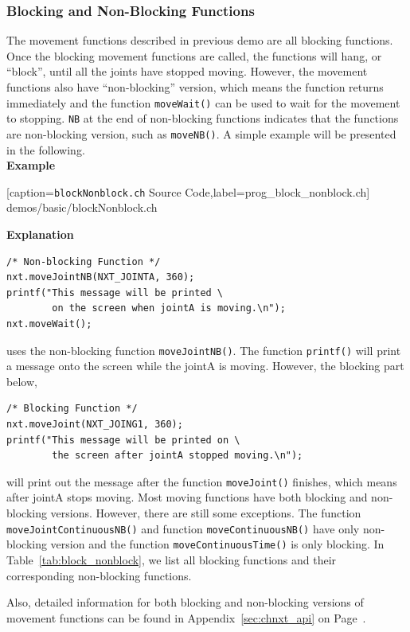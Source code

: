 \documentclass[11pt]{article}
\begin{document}
\subsubsection{\label{sec:block_nonblock}Blocking and Non-Blocking Functions}
The movement functions described in previous demo are all blocking functions. 
Once the blocking movement functions are called, the functions will hang, or 
``block'', until all the joints have stopped moving. However, the movement 
functions also have ``non-blocking'' version, which means the function returns 
immediately and the function {\tt moveWait()} can be used to wait for the 
movement to stopping. {\tt NB} at the end of non-blocking functions indicates 
that the functions are non-blocking version, such as {\tt moveNB()}. A simple 
example will be presented in the following.\\

\noindent
{\bf Example}

[caption={{\tt blockNonblock.ch} Source Code},label=prog_block_nonblock.ch]
{demos/basic/blockNonblock.ch}

\noindent
\textbf{Explanation}\\

\begin{lstlisting}
/* Non-blocking Function */
nxt.moveJointNB(NXT_JOINTA, 360);
printf("This message will be printed \
        on the screen when jointA is moving.\n");
nxt.moveWait();
\end{lstlisting}
uses the non-blocking function {\tt moveJointNB()}. The function {\tt printf()} 
will print a message onto the screen while the jointA is moving. However, the 
blocking part below,
\begin{lstlisting}
/* Blocking Function */
nxt.moveJoint(NXT_JOING1, 360);
printf("This message will be printed on \
        the screen after jointA stopped moving.\n");
\end{lstlisting}
will print out the message after the function {\tt moveJoint()} finishes, which 
means after jointA stops moving. Most moving functions have both blocking and 
non-blocking versions. However, there are still some exceptions. The function 
{\tt moveJointContinuousNB()} and function {\tt moveContinuousNB()} have only 
non-blocking version and the function {\tt moveContinuousTime()} is only blocking. 
In Table~\ref{tab:block_nonblock}, we list all blocking functions and their 
corresponding non-blocking functions.

Also, detailed information for both blocking and non-blocking versions of movement 
functions can be found in Appendix~\ref{sec:chnxt_api} on Page~\pageref{sec:chnxt_api}.
\end{document}
